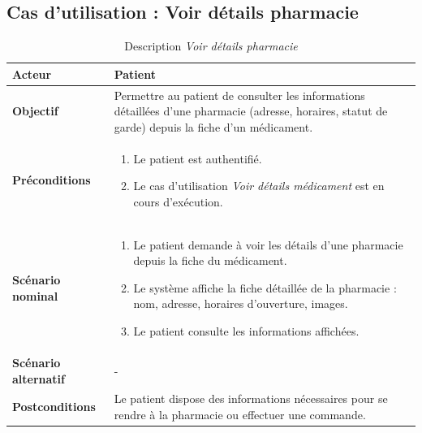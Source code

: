 \documentclass[12pt,a4paper]{report}
\begin{document}
\subsection*{Cas d'utilisation : Voir détails pharmacie}

\begin{table}[H]
    \centering
    \begin{tabular}{|p{4cm}|p{9cm}|}
        \hline
        \textbf{Acteur} & Patient \\
        \hline
        \textbf{Objectif} & Permettre au patient de consulter les informations détaillées d'une pharmacie (adresse, horaires, statut de garde) depuis la fiche d'un médicament. \\
        \hline
        \textbf{Préconditions} &
        \begin{enumerate}
            \item Le patient est authentifié.
            \item Le cas d'utilisation \textit{Voir détails médicament} est en cours d'exécution.
        \end{enumerate} \\
        \hline
        \textbf{Scénario nominal} &
        \begin{enumerate}
            \item Le patient demande à voir les détails d'une pharmacie depuis la fiche du médicament.
            \item Le système affiche la fiche détaillée de la pharmacie : nom, adresse, horaires d'ouverture, images.
            \item Le patient consulte les informations affichées.
        \end{enumerate} \\
        \hline
        \textbf{Scénario alternatif} & - \\
        \hline
        \textbf{Postconditions} & Le patient dispose des informations nécessaires pour se rendre à la pharmacie ou effectuer une commande. \\
        \hline
    \end{tabular}
    \caption{Description \textit{Voir détails pharmacie}}
\end{table}

\end{document}
